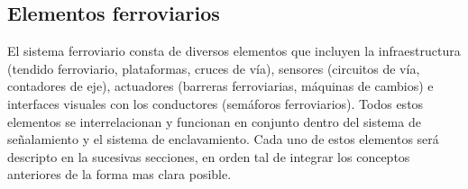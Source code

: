 \subsection{Elementos ferroviarios}

El sistema ferroviario consta de diversos elementos que incluyen la infraestructura (tendido ferroviario, plataformas, cruces de vía), sensores (circuitos de vía, contadores de eje), actuadores (barreras ferroviarias, máquinas de cambios) e interfaces visuales con los conductores (semáforos ferroviarios). Todos estos elementos se interrelacionan y funcionan en conjunto dentro del sistema de señalamiento y el sistema de enclavamiento. Cada uno de estos elementos será descripto en la sucesivas secciones, en orden tal de integrar los conceptos anteriores de la forma mas clara posible.









